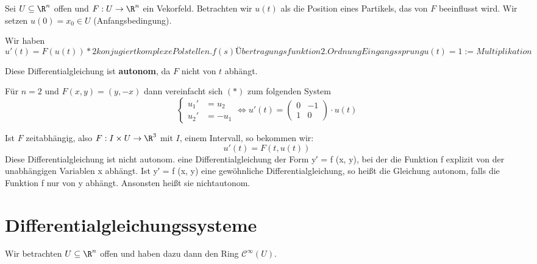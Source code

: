 \documentclass[main.tex]{subfiles}
\begin{document}
\begin{Beispiel}
  Sei $U \subseteq \R^n$ offen und $F: U \to \R^n$ ein Vekorfeld. Betrachten wir $u(t)$ als die Position eines Partikels, das von $F$ beeinflusst wird. Wir setzen $u(0) = x_0 \in U$ (Anfangsbedingung).

  Wir haben
  \begin{equation*}
    u'(t) = F(u(t)) \tag{*}
    * 2 konjugiert komplexe Polstellen. f(s) Übertragungsfunktion 2. Ordnung Eingangssprung u(t) = 1 := Multiplikation
  \end{equation*}

  Diese Differentialgleichung ist \textbf{autonom}, da $F$ nicht von $t$ abhängt.

  Für $n = 2$ und $F(x,y) = (y,-x)$ dann vereinfacht sich $(*)$ zum folgenden System
  $$\left\{\begin{aligned}
    u_1' & = u_2 \\ u_2' & = -u_1
  \end{aligned}\right. \Leftrightarrow u'(t) = \begin{pmatrix}
    0 & -1 \\ 1 & 0
  \end{pmatrix} \cdot u(t)$$

  Ist $F$ zeitabhängig, also $F: I \times U \to \R^3$ mit $I$, einem Intervall, so bekommen wir:
  $$u'(t) = F(t,u(t))$$
  Diese Differentialgleichung ist nicht autonom.
  eine Differentialgleichung der Form y′ = f (x, y), bei der die Funktion f explizit von der unabhängigen Variablen x abhängt. Ist y′ = f (x, y) eine gewöhnliche Differentialgleichung, so heißt die Gleichung autonom, falls die Funktion f nur von y abhängt. Ansonsten heißt sie nichtautonom.
\end{Beispiel}


\section{Differentialgleichungssysteme}

Wir betrachten $U \subseteq \R^n$ offen und haben dazu dann den Ring $\mathcal{C}^\infty(U)$.
\end{document}
